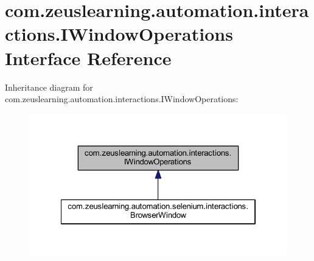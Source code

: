 \hypertarget{interfacecom_1_1zeuslearning_1_1automation_1_1interactions_1_1IWindowOperations}{}\section{com.\+zeuslearning.\+automation.\+interactions.\+I\+Window\+Operations Interface Reference}
\label{interfacecom_1_1zeuslearning_1_1automation_1_1interactions_1_1IWindowOperations}


Inheritance diagram for com.\+zeuslearning.\+automation.\+interactions.\+I\+Window\+Operations\+:\nopagebreak
\begin{figure}[H]
\begin{center}
\leavevmode
\includegraphics[width=322pt]{d8/d64/interfacecom_1_1zeuslearning_1_1automation_1_1interactions_1_1IWindowOperations__inherit__graph}
\end{center}
\end{figure}
